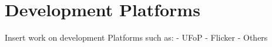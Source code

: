 \section{Development Platforms} %
\label{sec:development_platforms}


Insert work on development Platforms such as:
- UFoP
- Flicker
- Others
